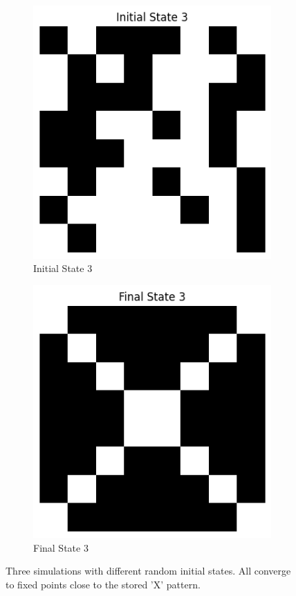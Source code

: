 \documentclass{article}
\begin{document}
\begin{figure}[H]
\begin{subfigure}{0.2\textwidth}
\includegraphics[width=\textwidth]{Initial State 3.png}
\caption{Initial State 3}
\end{subfigure}
\begin{subfigure}{0.2\textwidth}
\includegraphics[width=\textwidth]{Final State 3.png}
\caption{Final State 3}
\end{subfigure}
\caption{Three simulations with different random initial states. All converge to fixed points close to the stored 'X' pattern.}
\label{fig:fixed_points}
\end{figure}
\end{document}
